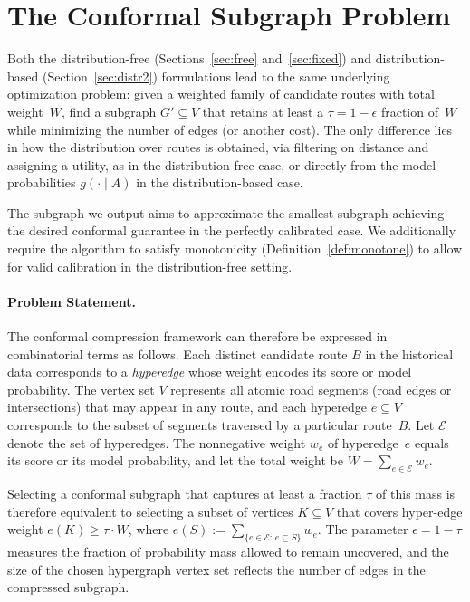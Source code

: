 \section{The Conformal Subgraph Problem}
\label{sec:statement}
Both the distribution-free (Sections~\ref{sec:free} and~\ref{sec:fixed}) and distribution-based (Section~\ref{sec:distr2}) formulations lead to the same underlying optimization problem: given a weighted family of candidate routes with total weight~$W$, find a subgraph $G'\subseteq V$ that retains at least a $\tau = 1-\epsilon$ fraction of~$W$ while minimizing the number of edges (or another cost). The only difference lies in how the distribution over routes is obtained, via filtering on distance and assigning a utility, as in the distribution-free case, or directly from the model probabilities $g(\cdot\mid A)$ in the distribution-based case. 

The subgraph we output aims to approximate the smallest subgraph achieving the desired conformal guarantee in the perfectly calibrated case. We additionally require the algorithm to satisfy monotonicity (Definition~\ref{def:monotone}) to allow for valid calibration in the distribution-free setting.

\paragraph{Problem Statement.} The  conformal compression framework can therefore be expressed in combinatorial terms as follows. Each distinct candidate route $B$ in the historical data corresponds to a \emph{hyperedge} whose weight encodes its score or model probability.  The vertex set $V$ represents all atomic road segments (road edges or intersections) that may appear in any route, and each hyperedge $e\subseteq V$ corresponds to the subset of segments traversed by a particular route~$B$. Let $\mathcal E$ denote the set of hyperedges. The nonnegative weight $w_e$ of hyperedge~$e$ equals its score or its model probability, and let the total weight be $W=\sum_{e\in\mathcal E}w_e$.

Selecting a conformal subgraph that captures at least a fraction $\tau$ of this mass is therefore equivalent to selecting a subset of vertices $K\subseteq V$ that covers  hyper-edge weight $e(K)\ge \tau \cdot W$, where $e(S) := \sum_{\{e\in\mathcal E:\,e\subseteq S\}} w_e$. The parameter $\epsilon=1-\tau$ measures the fraction of probability mass allowed to remain uncovered, and the size of the chosen hypergraph vertex set reflects the number of edges in the compressed subgraph.

